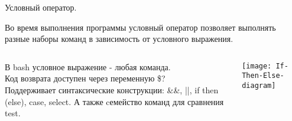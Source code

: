 \begin{frame}[fragile]{Условный оператор.}

Во время выполнения программы условный оператор позволяет выполнять разные наборы команд в зависимость от условного выражения.
\begin{columns}

В bash условное выражение - любая \alert{команда}. \\

Код возврата доступен через переменную \alert{\$?} \\

Поддерживает синтаксические конструкции: \alert{\&\&}, \alert{||}, \alert{if then (else)}, \alert{case}, \alert{select}.
А также cемейство команд для сравнения \alert{test}.

\center\texttt{[image: If-Then-Else-diagram]}

 \end{columns}
    
\end{frame}
